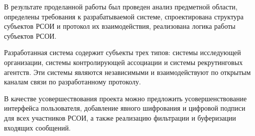 \Conclusion %

В результате проделанной работы был проведен анализ предметной области, определены требования к разрабатываемой системе, спроектирована структура субъектов РСОИ и протокол их взаимодействия, реализована логика работы субъектов РСОИ.

Разработанная система содержит субъекты трех типов: системы исследующей организации, системы контролирующей ассоциации и системы рекрутинговых агентств. Эти системы являются независимыми и взаимодействуют по открытым каналам связи по разработанному протоколу.

В качестве усовершествования проекта можно предложить усовершенствование интерфейса пользователя, добавление явного шифрования и цифровой подписи для всех участников РСОИ, а также реализацию фильтрации и буферизации входящих сообщений.

